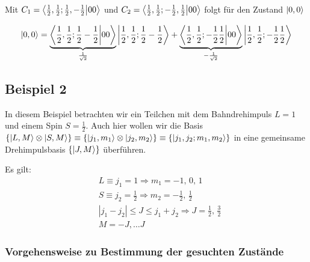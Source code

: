 Mit \(C_1 =\braket{\frac{1}{2},\frac{1}{2};\frac{1}{2},-\frac{1}{2}}{00} \) und  \(C_2 =\braket{\frac{1}{2},\frac{1}{2};-\frac{1}{2},\frac{1}{2}}{00} \) folgt für den Zustand \(\left| 0,0 \right\rangle\)

\begin{equation}
  \label{eq:42}
   \ket{0,0} = \underbr{\braket{\frac{1}{2},\frac{1}{2};\frac{1}{2}-\frac{1}{2}}{00}}_{\frac{1}{\sqrt{2}}}\ket{ \frac{1}{2},\frac{1}{2};\frac{1}{2}-\frac{1}{2} }  +\underbr{\braket{\frac{1}{2},\frac{1}{2};-\frac{1}{2}\frac{1}{2}}{00}}_{-\frac{1}{\sqrt{2}}}\ket{\frac{1}{2},\frac{1}{2};-\frac{1}{2}\frac{1}{2}} 
\end{equation}

\subsection{Beispiel 2}
\label{sec:beispiel-2}
In diesem Beispiel betrachten wir ein Teilchen mit dem Bahndrehimpuls \(L=1\)
und einem Spin \(S=\frac 1 2\). Auch hier wollen wir die Basis
\(\{\left| L,M \right\rangle\otimes\left| S,M \right\rangle\}\equiv\{\left| j_1,m_1 \right\rangle\otimes\left| j_2,m_2 \right\rangle\}
\equiv\{\left| j_1,j_2;m_1,m_2 \right\rangle\}\) in eine gemeinsame Drehimpulsbasis
\(\{\left| J,M \right\rangle\}\) überführen.

Es gilt:
\begin{subequations}
  \begin{align}
    &L \equiv j_1 = 1 \Rightarrow m_1=-1,\, 0,\, 1 \label{eq:43}\\
    &S\equiv j_2 = \frac 1 2 \Rightarrow m_2=-\frac 1 2,\, 
    \frac 1 2 \label{eq:44}\\
    &|j_1-j_2|\leq J\leq j_1+j_2  \Rightarrow J= \frac 1 2,\,\frac 3 2
    \label{eq:45}\\
    &M=-J,\dots J\label{eq:46}
  \end{align}
\end{subequations}

\subsubsection{Vorgehensweise zu Bestimmung der gesuchten Zustände}
\label{sec:vorgehensweise}

